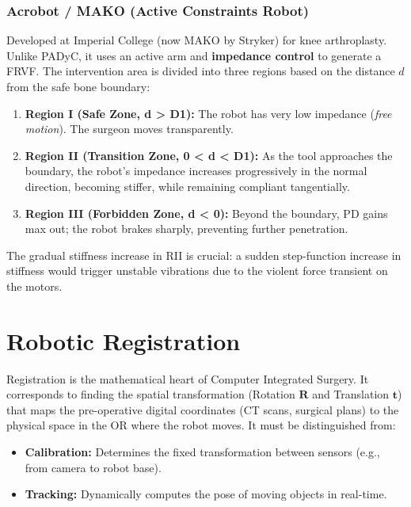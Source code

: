 \documentclass[11pt,a4paper,twoside]{report}
\begin{document}
\subsection{Acrobot / MAKO (Active Constraints Robot)}
Developed at Imperial College (now MAKO by Stryker) for knee arthroplasty. Unlike PADyC, it uses an active arm and \textbf{impedance control} to generate a FRVF.
The intervention area is divided into three regions based on the distance $d$ from the safe bone boundary:
\begin{enumerate}
    \item \textbf{Region I (Safe Zone, d > D1):} The robot has very low impedance (\textit{free motion}). The surgeon moves transparently.
    \item \textbf{Region II (Transition Zone, 0 < d < D1):} As the tool approaches the boundary, the robot's impedance increases progressively in the normal direction, becoming stiffer, while remaining compliant tangentially.
    \item \textbf{Region III (Forbidden Zone, d < 0):} Beyond the boundary, PD gains max out; the robot brakes sharply, preventing further penetration.
\end{enumerate}
The gradual stiffness increase in RII is crucial: a sudden step-function increase in stiffness would trigger unstable vibrations due to the violent force transient on the motors.

\chapter{Robotic Registration}

Registration is the mathematical heart of Computer Integrated Surgery. It corresponds to finding the spatial transformation (Rotation $\mathbf{R}$ and Translation $\mathbf{t}$) that maps the pre-operative digital coordinates (CT scans, surgical plans) to the physical space in the OR where the robot moves.
It must be distinguished from:
\begin{itemize}
    \item \textbf{Calibration:} Determines the fixed transformation between sensors (e.g., from camera to robot base).
    \item \textbf{Tracking:} Dynamically computes the pose of moving objects in real-time.
\end{itemize}
\end{document}
